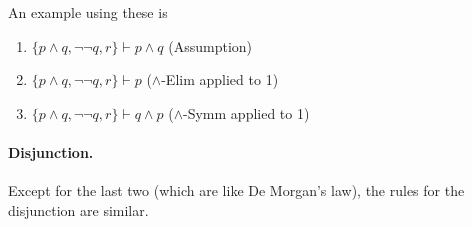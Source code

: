 \begin{prooftree}
\end{prooftree}

\begin{prooftree}
\end{prooftree}

An example using these is
\begin{enumerate}
    \item $\{p\wedge q, \neg\neg q, r\}\vdash p\wedge q$ \hfill (\textsf{Assumption})
    \item $\{p\wedge q, \neg\neg q, r\}\vdash p$ \hfill (\textsf{$\wedge$-Elim} applied to 1)
    \item $\{p\wedge q, \neg\neg q, r\}\vdash q\wedge p$ \hfill (\textsf{$\wedge$-Symm} applied to 1)
\end{enumerate}

\paragraph{Disjunction.}

Except for the last two (which are like De Morgan's law), the rules for the disjunction are similar.

\begin{prooftree}
\end{prooftree}

\begin{prooftree}
\end{prooftree}

\begin{prooftree}
\end{prooftree}

\begin{prooftree}
\end{prooftree}

